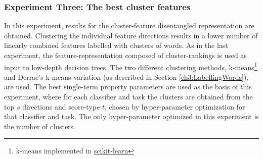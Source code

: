 \subsubsection{Experiment Three: The best cluster features}\label{ch3:ex3}

In this experiment, results for the cluster-feature disentangled representation are obtained. Clustering the individual feature directions  results in a lower number of linearly combined features labelled with clusters of words. As in the last experiment, the  feature-representation composed of cluster-rankings is used as input to low-depth decision trees.  The two different clustering methods,  k-means\footnote{k-means implemented in \href{https://scikit-learn.org/stable/modules/generated/sklearn.cluster.MiniBatchKMeans.html}{scikit-learn}} and Derrac's k-means variation (as described in Section \ref{ch3:LabellingWords}), are used. The best single-term property parameters are used as the basis of this experiment, where for each classifier and task the clusters are obtained from the top $s$ directions and score-type $t$,  chosen by hyper-parameter optimization for that classifier and task. The only hyper-parameter optimized in this experiment is the number of clusters.






